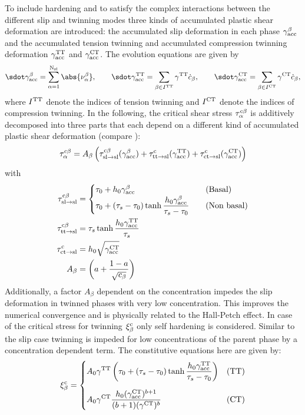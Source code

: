   To include hardening and to satisfy the complex interactions between the different slip and twinning modes three kinds of accumulated plastic shear deformation are introduced: the accumulated slip deformation in each phase $\gamma_{\rm acc}^{\beta}$ and the accumulated tension twinning and accumulated compression twinning deformation $\gamma_{\rm acc}^{\rm TT}$ and $\gamma_{\rm acc}^{\rm CT}$. The evolution equations are given by
  \begin{equation}
    \gammaaccbdot = \sumaI \abs{\nuab}, \qquad \gammaaccttdot = \sum_{\beta \in \Itt} \gammatt \cbdot, \qquad \gammaaccctdot = \sum_{\beta \in \Ict} \gammact \cbdot,
  \end{equation}
  where $I^{\rm TT}$ denote the indices of tension twinning and $I^{\rm CT}$ denote the indices of compression twinning. In the following, the critical shear stress $\tau_{\alpha}^{c\beta}$ is additively decomposed into three parts that each depend on a different kind of accumulated plastic shear deformation (compare ):
  \begin{equation}
    \tau_{\alpha}^{c\beta} = A_{\beta} \left( \tau^{\rm c\beta}_{\rm sl\rightarrow sl}(\gamma_{\rm acc}^{\beta}) + \tau^{\rm c}_{\rm tt\rightarrow sl}(\gamma_{\rm acc}^{\rm TT}) + \tau^{\rm c}_{\rm ct\rightarrow sl}(\gamma_{\rm acc}^{\rm CT}) \right)
    \label{eq:tauacb}
  \end{equation}
  with
  \begin{align}
    \tau^{\rm c\beta}_{\rm sl\rightarrow sl} &=
    \begin{cases}
        \tau_0 + {h}_{0} \gamma_{\rm acc}^{\beta} & \text{\quad (Basal)}  \\
        \displaystyle \tau_0 + (\tau_s-\tau_0) \tanh{\frac{{h}_{0}\gamma_{\rm acc}^{\beta}}{\tau_s-\tau_0}} & \text{\quad (Non basal)}
    \end{cases} \\
    \tau^{\rm c \beta}_{\rm tt\rightarrow sl} &= \tau_s \tanh{\frac{{h}_{0}\gamma_{\rm acc}^{\rm TT}}{\tau_s}} \label{eq:tauCttsl}\\
    \tau^{\rm c}_{\rm ct\rightarrow sl} &= {h}_{0} \sqrt{\gamma_{\rm acc}^{\rm CT}} \\
    A_{\beta} & =  \left( a + \frac{1-a}{\sqrt{c_{\beta}}} \right) \label{eq:Ab}
  \end{align}
  Additionally, a factor $A_\beta$ dependent on the concentration impedes the slip deformation in twinned phases with very low concentration. This improves the numerical convergence and is physically related to the Hall-Petch effect. In case of the critical stress for twinning $\xi_{\beta}^{\rm c}$ only self hardening is considered. Similar to the slip case twinning is impeded for low concentrations of the parent phase by a concentration dependent term. The constitutive equations here are given by:
  \begin{equation}
      \xi_{\beta}^{\rm c} = 
      \begin{cases}
          \displaystyle A_0 \gamma^{\rm TT} \left( \tau_0 + (\tau_s - \tau_0) \tanh{\frac{{h}_{0}\gamma_{\rm acc}^{\rm TT}}{\tau_s-\tau_0}} \right)& \text{(TT)}\\[15pt]
          \displaystyle A_0 \gamma^{\rm CT} \frac{{h}_{0} (\gamma_{\rm acc}^{\rm CT})^{b+1}}{(b+1){(\gamma^{\rm CT}})^b}  & \text{(CT)}
      \end{cases}
  \end{equation}

